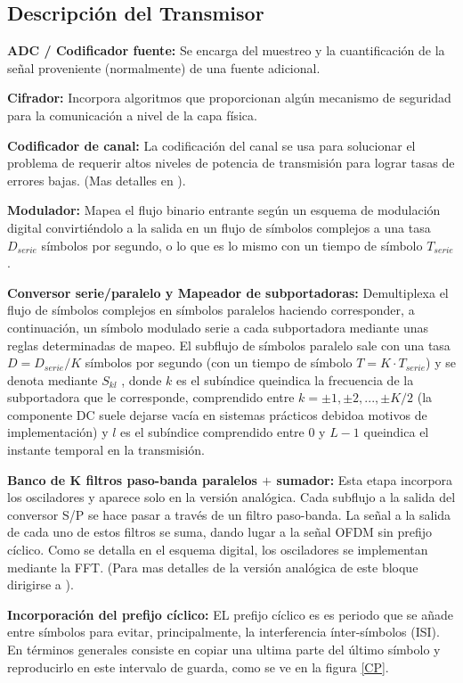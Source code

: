\documentclass[a4paper,12pt]{report} %
\begin{document}
\subsection{Descripción del Transmisor}

\textbf{ADC / Codificador fuente:} Se encarga del muestreo y la cuantificación de la señal proveniente (normalmente) de una fuente adicional.

\textbf{Cifrador:} Incorpora algoritmos que proporcionan algún mecanismo de seguridad para la
comunicación a nivel de la capa física.

\textbf{Codificador de canal:} La codificación del canal se usa para solucionar el problema de requerir altos niveles de potencia de transmisión para lograr tasas de errores bajas. (Mas detalles en \cite{tesis}).

\textbf{Modulador:} Mapea el flujo binario entrante según un esquema de modulación digital convirtiéndolo a la salida en un flujo de símbolos complejos a una tasa $D_{serie}$ símbolos por segundo, o lo que es lo mismo con un tiempo de símbolo $T_{serie}$.

\textbf{Conversor serie/paralelo y Mapeador de subportadoras:} Demultiplexa el flujo de símbolos complejos en  símbolos paralelos haciendo corresponder, a continuación, un símbolo modulado serie a cada subportadora mediante
unas reglas determinadas de mapeo. El subflujo
de símbolos paralelo sale con una tasa $D = D_{serie}/K$ símbolos por segundo (con un
tiempo de símbolo $T = K\cdot T_{serie}$) y se denota mediante $S_{kl}$ , donde $k$ es el subíndice queindica la frecuencia de la subportadora que le corresponde, comprendido entre $k = ±1, ±2, ... , ±K/2$ (la componente DC suele dejarse vacía en sistemas prácticos debidoa motivos de implementación) y $l$ es el subíndice comprendido entre 0 y $L-1$ queindica el instante temporal en la transmisión.

\textbf{Banco de K filtros paso-banda paralelos $+$ sumador:} Esta etapa incorpora los osciladores y aparece solo en la versión analógica. Cada subflujo  a la salida del conversor S/P se hace pasar a través de un filtro
paso-banda. La señal a la salida de cada uno de estos filtros se suma, dando lugar a la señal
OFDM sin prefijo cíclico.
Como se detalla en el esquema digital, los osciladores se implementan mediante la FFT. (Para mas detalles de la versión analógica de este bloque dirigirse a \cite{tesis}).

\textbf{Incorporación del prefijo cíclico:} EL prefijo cíclico es es periodo que se añade entre símbolos para evitar, principalmente, la interferencia ínter-símbolos (ISI). En términos generales consiste en copiar una ultima parte del último símbolo y reproducirlo en este intervalo de guarda, como se ve en la figura \ref{CP}.
\end{document}
